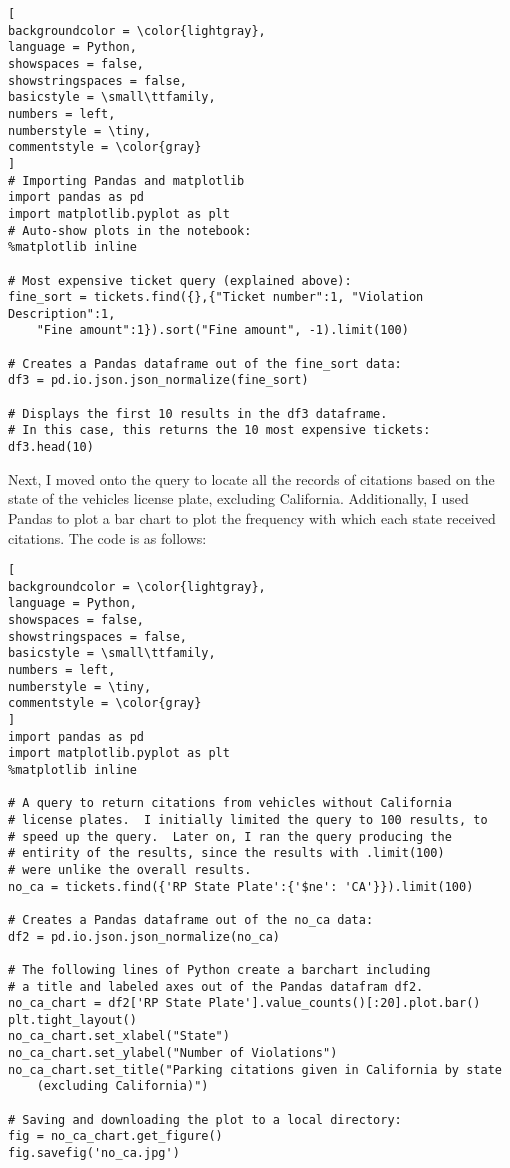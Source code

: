 \documentclass[]{article}
\begin{document}
\begin{lstlisting}[
backgroundcolor = \color{lightgray},
language = Python,
showspaces = false,
showstringspaces = false,
basicstyle = \small\ttfamily,
numbers = left,
numberstyle = \tiny,
commentstyle = \color{gray}
]
# Importing Pandas and matplotlib
import pandas as pd
import matplotlib.pyplot as plt
# Auto-show plots in the notebook:
%matplotlib inline

# Most expensive ticket query (explained above):
fine_sort = tickets.find({},{"Ticket number":1, "Violation Description":1, 
	"Fine amount":1}).sort("Fine amount", -1).limit(100)

# Creates a Pandas dataframe out of the fine_sort data:
df3 = pd.io.json.json_normalize(fine_sort)

# Displays the first 10 results in the df3 dataframe.
# In this case, this returns the 10 most expensive tickets:
df3.head(10)
\end{lstlisting}

Next, I moved onto the query to locate all the records of citations based on the state of the vehicles license plate, excluding California.  Additionally, I used Pandas to plot a bar chart to plot the frequency with which each state received citations.  The code is as follows: 

\begin{lstlisting}[
backgroundcolor = \color{lightgray},
language = Python,
showspaces = false,
showstringspaces = false,
basicstyle = \small\ttfamily,
numbers = left,
numberstyle = \tiny,
commentstyle = \color{gray}
]
import pandas as pd
import matplotlib.pyplot as plt
%matplotlib inline

# A query to return citations from vehicles without California
# license plates.  I initially limited the query to 100 results, to 
# speed up the query.  Later on, I ran the query producing the
# entirity of the results, since the results with .limit(100)
# were unlike the overall results.
no_ca = tickets.find({'RP State Plate':{'$ne': 'CA'}}).limit(100)

# Creates a Pandas dataframe out of the no_ca data:
df2 = pd.io.json.json_normalize(no_ca)

# The following lines of Python create a barchart including 
# a title and labeled axes out of the Pandas datafram df2.
no_ca_chart = df2['RP State Plate'].value_counts()[:20].plot.bar()
plt.tight_layout()
no_ca_chart.set_xlabel("State")
no_ca_chart.set_ylabel("Number of Violations")
no_ca_chart.set_title("Parking citations given in California by state 
	(excluding California)")

# Saving and downloading the plot to a local directory:
fig = no_ca_chart.get_figure()
fig.savefig('no_ca.jpg')

\end{lstlisting}
\end{document}
